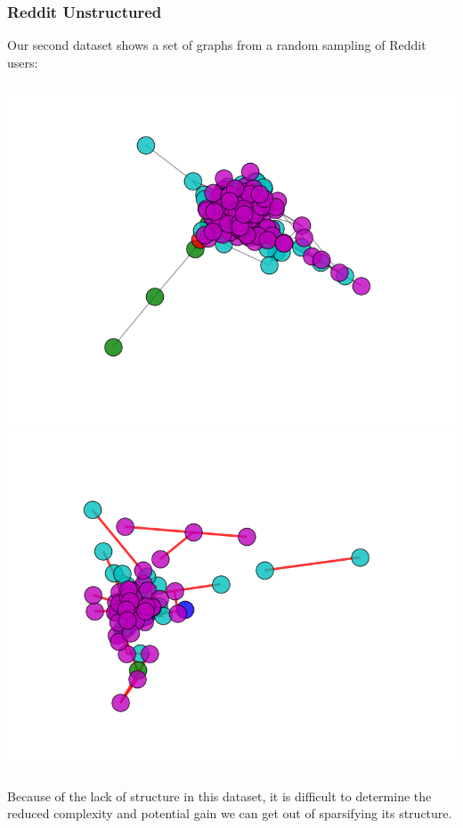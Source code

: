 \documentclass{article}
\begin{document}
\subsubsection{Reddit Unstructured}
Our second dataset shows a set of graphs from a random sampling of Reddit users:
\\\\
\includegraphics[scale=0.4]{imgs/reddit_unstructured/original.png}
\includegraphics[scale=0.4]{imgs/reddit_unstructured/hard.png}
\\\\
Because of the lack of structure in this dataset, it is difficult to determine the reduced complexity and potential gain we can get out of sparsifying its structure.
\end{document}
